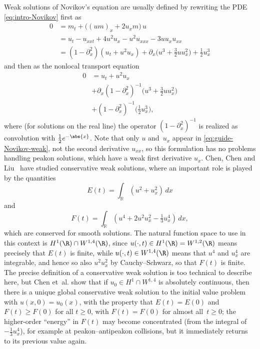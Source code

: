 \documentclass[10pt,a4paper]{article} \pdfoutput=1 
\begin{document}
Weak solutions of Novikov's equation are usually defined
by rewriting the PDE \eqref{eq:intro-Novikov} first as
\begin{equation}
  \begin{split}
    0 &=
    m_t + \bigl( (u m)_x + 2 u_x m \bigr) \, u
    \\ &
    = u_t - u_{xxt} + 4 u^2 u_x -  u^2 u_{xxx} - 3 u u_x u_{xx}
    \\ &
    = (1 - \partial_x^2)(u_t + u^2 u_x) + \partial_x \bigl( u^3 + \tfrac32 u u_x^2 \bigr) + \tfrac12 u_x^3
  \end{split}
\end{equation}
and then as the nonlocal transport equation
\begin{equation}
  \label{eq:guide-Novikov-weak}
  \begin{split}
    0 &=
    u_t + u^2 u_x
    \\ &
    + \partial_x (1-\partial_x^2)^{-1} \bigl( u^3 + \tfrac32 u u_x^2 \bigr)
    \\ &
    + (1-\partial_x^2)^{-1} \bigl( \tfrac12 u_x^3 \bigr)
    ,
  \end{split}
\end{equation}
where (for solutions on the real line) the operator $(1-\partial_x^2)^{-1}$ is realized
as convolution with $\tfrac12 e^{-\abs{x}}$.
Note that only $u$ and~$u_x$ appear in \eqref{eq:guide-Novikov-weak},
not the second derivative $u_{xx}$,
so this formulation has no problems handling peakon solutions,
which have a weak first derivative $u_x$.
Chen, Chen and Liu~\cite{chen-chen-liu:2018:novikov-global-conservative-weak-existence-uniqueness}
have studied conservative weak solutions,
where an important role is played by the quantities
\begin{equation}
  E(t) = \int_{\mathbb{R}} (u^2 + u_x^2) \, dx
\end{equation}
and
\begin{equation}
  F(t) = \int_{\mathbb{R}} (u^4 + 2 u^2 u_x^2 - \tfrac13 u_x^4) \, dx
  ,
\end{equation}
which are conserved for smooth solutions.
The natural function space to use in this context is
$H^1(\R) \cap W^{1,4}(\R)$,
since
$u(\cdot, t) \in H^1(\R) = W^{1,2}(\R)$
means precisely that $E(t)$ is finite,
while
$u(\cdot, t) \in W^{1,4}(\R)$
means that $u^4$ and $u_x^4$ are integrable,
and hence so also $u^2 u_x^2$ by Cauchy--Schwarz, so that $F(t)$ is finite.
The precise definition of a conservative weak solution is too technical to describe here,
but Chen et~al. show that if $u_0 \in H^1 \cap W^{1,4}$ is absolutely continuous, then there is a unique global
conservative weak solution to the initial value problem with $u(x,0)=u_0(x)$,
with the property that $E(t) = E(0)$ and $F(t) \ge F(0)$ for all $t \ge 0$, with
$F(t) = F(0)$ for almost all~$t \ge 0$;
the higher-order ``energy'' in $F(t)$ may become concentrated
(from the integral of $-\tfrac13 u_x^4$), for example at peakon--antipeakon collisions,
but it immediately returns to its previous value again.
\end{document}
